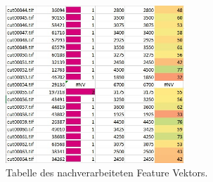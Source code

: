 \begin{figure}[H]
  \centering
  \includegraphics[width=0.6\textwidth]{Resultate/Nachverarbeitung.jpg} 
  \caption{Tabelle des nachverarbeiteten Feature Vektors.}
  \label{bNachverarbeitung}
\end{figure}